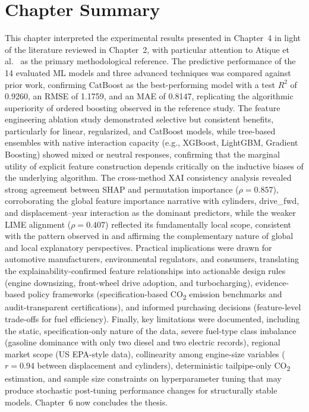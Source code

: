 \section{Chapter Summary}

This chapter interpreted the experimental results presented in Chapter~4 in light of the literature reviewed in Chapter~2, with particular attention to Atique et al.~\cite{atique2026explainable} as the primary methodological reference. The predictive performance of the 14 evaluated ML models and three advanced techniques was compared against prior work, confirming CatBoost as the best-performing model with a test \(R^2\) of 0.9260, an RMSE of 1.1759, and an MAE of 0.8147, replicating the algorithmic superiority of ordered boosting observed in the reference study. The feature engineering ablation study demonstrated selective but consistent benefits, particularly for linear, regularized, and CatBoost models, while tree-based ensembles with native interaction capacity (e.g., XGBoost, LightGBM, Gradient Boosting) showed mixed or neutral responses, confirming that the marginal utility of explicit feature construction depends critically on the inductive biases of the underlying algorithm. The cross-method XAI consistency analysis revealed strong agreement between SHAP and permutation importance (\(\rho = 0.857\)), corroborating the global feature importance narrative with cylinders, drive\_fwd, and displacement--year interaction as the dominant predictors, while the weaker LIME alignment (\(\rho = 0.407\)) reflected its fundamentally local scope, consistent with the pattern observed in \cite{atique2026explainable} and affirming the complementary nature of global and local explanatory perspectives. Practical implications were drawn for automotive manufacturers, environmental regulators, and consumers, translating the explainability-confirmed feature relationships into actionable design rules (engine downsizing, front-wheel drive adoption, and turbocharging), evidence-based policy frameworks (specification-based CO\textsubscript{2} emission benchmarks and audit-transparent certifications), and informed purchasing decisions (feature-level trade-offs for fuel efficiency). Finally, key limitations were documented, including the static, specification-only nature of the data, severe fuel-type class imbalance (gasoline dominance with only two diesel and two electric records), regional market scope (US EPA-style data), collinearity among engine-size variables (\(r = 0.94\) between displacement and cylinders), deterministic tailpipe-only CO\textsubscript{2} estimation, and sample size constraints on hyperparameter tuning that may produce stochastic post-tuning performance changes for structurally stable models. Chapter~6 now concludes the thesis.